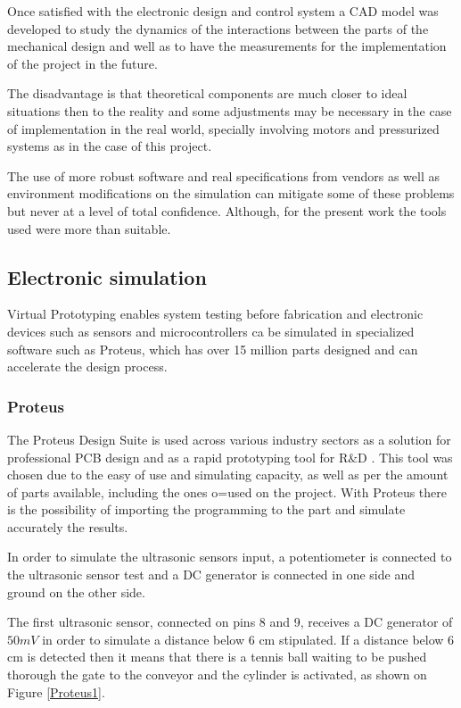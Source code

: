 \documentclass[transmag]{IEEEtran}
\begin{document}
Once satisfied with the electronic design and control system a CAD model was developed to study the dynamics of the interactions between the parts of the mechanical design and well as to have the measurements for the implementation of the project in the future.

The disadvantage is that theoretical components are much closer to ideal situations then to the reality and some adjustments may be necessary in the case of implementation in the real world, specially involving motors and pressurized systems as in the case of this project. 

The use of more robust software and real specifications from vendors as well as environment modifications on the simulation can mitigate some of these problems but never at a level of total confidence. Although, for the present work the tools used were more than suitable.


\subsection{Electronic simulation}


Virtual Prototyping enables system testing before fabrication and electronic devices such as sensors and microcontrollers ca be simulated in specialized software such as Proteus, which has over 15 million parts designed and can accelerate the design process.

\subsubsection{Proteus}

The Proteus Design Suite is used across various industry sectors as a solution for professional PCB design and as a rapid prototyping tool for R$\&$D \cite{ref3}. This tool was chosen due to the easy of use and simulating capacity, as well as per the amount of parts available, including the ones o=used on the project.
With Proteus there is the possibility of importing the programming to the part and simulate accurately the results.

In order to simulate the ultrasonic sensors input, a potentiometer is connected to the ultrasonic sensor test and a DC generator is connected in one side and ground on the other side. 

The first ultrasonic sensor, connected on pins 8 and 9, receives a DC generator of $50 mV$ in order to simulate a distance below 6 cm stipulated. If a distance below 6 cm is detected then it means that there is a tennis ball waiting to be pushed thorough the gate to the conveyor and the cylinder is activated, as shown on Figure \ref{Proteus1}. 
\end{document}
